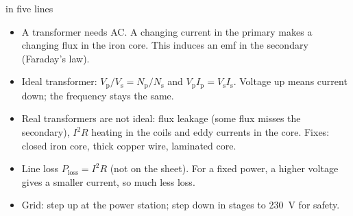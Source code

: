 \begin{summarybox}{ in five lines}
\begin{itemize}
  \item A transformer needs AC. A changing current in the primary makes a changing flux
        in the iron core. This induces an emf in the secondary (Faraday's law).
  \item Ideal transformer: $V_\mathrm{p}/V_\mathrm{s} = N_\mathrm{p}/N_\mathrm{s}$ and
        $V_\mathrm{p}I_\mathrm{p} = V_\mathrm{s}I_\mathrm{s}$. Voltage up means current
        down; the frequency stays the same.
  \item Real transformers are not ideal: flux leakage (some flux misses the secondary),
        $I^2R$ heating in the coils and eddy currents in the core. Fixes: closed iron
        core, thick copper wire, laminated core.
  \item Line loss $P_\mathrm{loss} = I^2R$ (not on the sheet). For a fixed power, a higher
        voltage gives a smaller current, so much less loss.
  \item Grid: step up at the power station; step down in stages to \qty{230}{V} for safety.
\end{itemize}
\end{summarybox}
